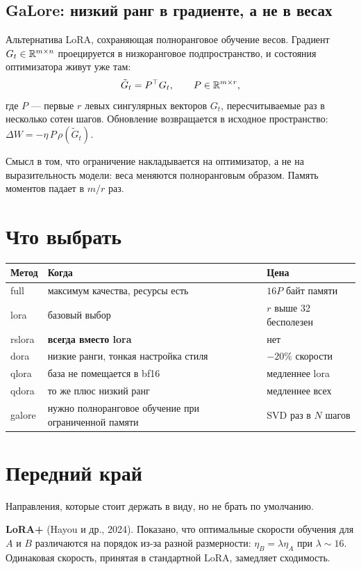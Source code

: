 \documentclass[11pt,a4paper]{article}
\begin{document}
\subsection{GaLore: низкий ранг в градиенте, а не в весах}

Альтернатива LoRA, сохраняющая полноранговое обучение весов.
Градиент $G_t \in \mathbb{R}^{m\times n}$ проецируется в низкоранговое
подпространство, и состояния оптимизатора живут уже там:
\[
\tilde{G}_t = P^\top G_t, \qquad P \in \mathbb{R}^{m \times r},
\]
где $P$ — первые $r$ левых сингулярных векторов $G_t$, пересчитываемые
раз в несколько сотен шагов. Обновление возвращается в исходное
пространство: $\Delta W = -\eta\, P\,\rho(\tilde{G}_t)$.

Смысл в том, что ограничение накладывается на оптимизатор, а не на
выразительность модели: веса меняются полноранговым образом. Память
моментов падает в $m/r$ раз.

\section{Что выбрать}

\begin{center}
\begin{tabular}{@{}lp{5.4cm}p{5.4cm}@{}}
\toprule
\textbf{Метод} & \textbf{Когда} & \textbf{Цена} \\
\midrule
full & максимум качества, ресурсы есть & $16P$ байт памяти \\
lora & базовый выбор & $r$ выше 32 бесполезен \\
rslora & \textbf{всегда вместо lora} & нет \\
dora & низкие ранги, тонкая настройка стиля & $-20\%$ скорости \\
qlora & база не помещается в bf16 & медленнее lora \\
qdora & то же плюс низкий ранг & медленнее всех \\
galore & нужно полноранговое обучение при ограниченной памяти & SVD раз в $N$ шагов \\
\bottomrule
\end{tabular}
\end{center}

\section{Передний край}

Направления, которые стоит держать в виду, но не брать по умолчанию.

\textbf{LoRA+} (Hayou и др., 2024). Показано, что оптимальные скорости
обучения для $A$ и $B$ различаются на порядок из-за разной размерности:
$\eta_B = \lambda \eta_A$ при $\lambda \sim 16$. Одинаковая скорость,
принятая в стандартной LoRA, замедляет сходимость.
\end{document}
